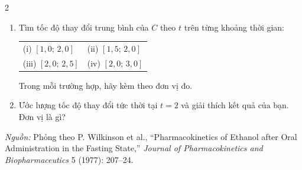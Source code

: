 \begin{multicols*}{2}
\vspace{-2pt}

\begin{enumerate}[label=(\alph*),leftmargin=1.4em,itemsep=1pt,topsep=2pt]
  \item Tìm tốc độ thay đổi trung bình của $C$ theo $t$ trên từng khoảng thời gian:
  \vspace{1pt}
  
  \noindent
  \begin{tabular}{@{}p{}p{}@{}}
  (i) $[1{,}0;\, 2{,}0]$ & (ii) $[1{,}5;\, 2{,}0]$ \\
  (iii) $[2{,}0;\, 2{,}5]$ & (iv) $[2{,}0;\, 3{,}0]$
  \end{tabular}
  
  \vspace{1pt}
  Trong mỗi trường hợp, hãy kèm theo đơn vị đo.
  \item Ước lượng tốc độ thay đổi tức thời tại $t = 2$ và giải thích kết quả của bạn. Đơn vị là gì?
\end{enumerate}

\vspace{3pt}

{\fontsize{7}{8.5}\selectfont\textit{Nguồn:} Phỏng theo P. Wilkinson et al., “Pharmacokinetics of Ethanol after Oral Administration in the Fasting State,” \textit{Journal of Pharmacokinetics and Biopharmaceutics} 5 (1977): 207--24.\par}

\end{multicols*}
